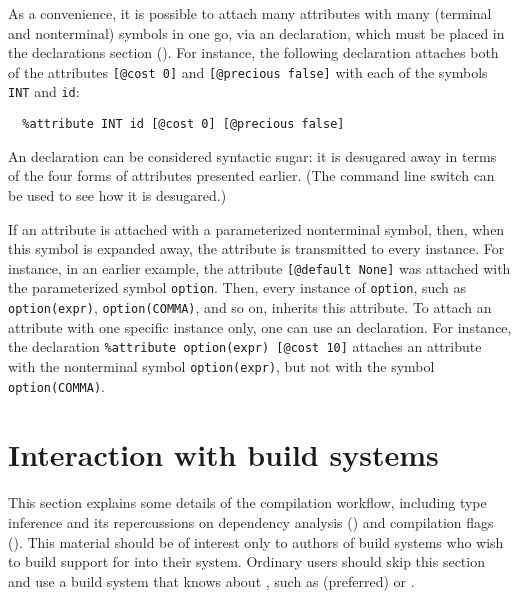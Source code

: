 \documentclass[onecolumn,11pt,nocopyrightspace,preprint]{sigplanconf}
\begin{document}

As a convenience, it is possible to attach many attributes with many (terminal
and nonterminal) symbols in one go, via an \dattribute declaration, which must
be placed in the declarations section ().
For instance, the following declaration attaches both of the attributes
\verb+[@cost 0]+ and \verb+[@precious false]+
with each of the symbols
\verb+INT+ and \verb+id+:
\begin{verbatim}
  %attribute INT id [@cost 0] [@precious false]
\end{verbatim}
An \dattribute declaration can be considered syntactic sugar: it is desugared
away in terms of the four forms of attributes presented earlier. (The command
line switch \oonlypreprocess can be used to see how it is desugared.)


If an attribute is attached with a parameterized nonterminal symbol, then,
when this symbol is expanded away, the attribute is transmitted to every
instance. For instance, in an earlier example, the attribute
\verb+[@default None]+ was attached with the parameterized symbol
\verb+option+. Then, every instance of \verb+option+, such as
\verb+option(expr)+, \verb+option(COMMA)+, and so on, inherits this
attribute. To attach an attribute with one specific
instance only, one can use an \dattribute declaration. For instance,
the declaration \verb+%attribute option(expr) [@cost 10]+ attaches
an attribute with the nonterminal symbol \verb+option(expr)+, but
not with the symbol \verb+option(COMMA)+.


\section{Interaction with build systems}
\label{sec:build}

This section explains some details of the compilation workflow, including
\ocaml type inference and its repercussions on dependency analysis
() and compilation flags ().
%
This material should be of interest only to authors of build systems
who wish to build support for \menhir into their system.
%
Ordinary users should skip this section and use a build system that knows
about \menhir, such as \hyperlink{dune}{\dune} (preferred) or \ocamlbuild.
\end{document}
